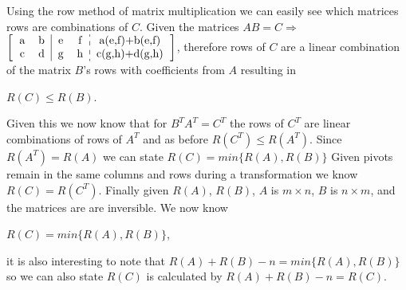 Using the row method of matrix multiplication we can easily see which matrices rows are combinations of $C$.  Given the matrices $AB=C \Rightarrow$ {$\begin{bmatrix} \begin{tabular}{cc|cc:c}
		     a & b & e & f & a(e,f)+b(e,f)  \\
		     c & d & g & h & c(g,h)+d(g,h) \\
		\end{tabular} \end{bmatrix}$}, therefore rows of $C$ are a linear combination of the matrix $B$'s rows with coefficients from $A$ resulting in  \begin{center} $R(C) \le R(B)$.\end{center}  Given this we now know that for $B^TA^T= C^T$ the rows of $C^T$ are linear combinations of  rows of $A^T$ and as before $R(C^T)\le R(A^T)$. Since $R(A^T)=R(A)$ we can state $R(C)=min\{R(A),R(B)\}$ Given pivots remain in the same columns and rows during a transformation we know $R(C)=R(C^T)$.  Finally given $R(A)$, $R(B)$, $A$ is $m\times n$, $B$ is $n\times m$, and the matrices are are inversible. We now know \begin{center} $R(C)=min\{R(A),R(B)\}$, \end{center} it is also interesting to note that $R(A)+R(B)-n=min\{R(A),R(B)\}$ so we can also state $R(C)$ is calculated by $R(A)+R(B)-n=R(C)$.
